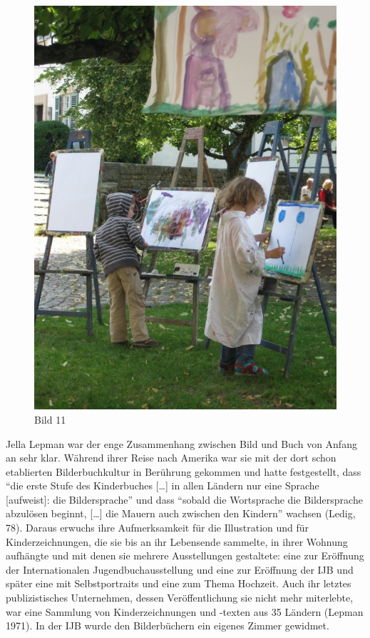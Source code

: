 \documentclass[a4paper,
fontsize=11pt,
oneside,
numbers=noperiodatend,
parskip=half-,
bibliography=totoc,
final
]{scrartcl}
\begin{document}
\begin{figure}[htbp]
\centering
\includegraphics{img/Bild11.jpg}
\caption{Bild 11}
\end{figure}

Jella Lepman war der enge Zusammenhang zwischen Bild und Buch von Anfang
an sehr klar. Während ihrer Reise nach Amerika war sie mit der dort
schon etablierten Bilderbuchkultur in Berührung gekommen und hatte
festgestellt, dass \enquote{die erste Stufe des Kinderbuches
{[}\ldots{}{]} in allen Ländern nur eine Sprache {[}aufweist{]}: die
Bildersprache} und dass \enquote{sobald die Wortsprache die
Bildersprache abzulösen beginnt, {[}\ldots{}{]} die Mauern auch zwischen
den Kindern} wachsen (Ledig, 78). Daraus erwuchs ihre Aufmerksamkeit für
die Illustration und für Kinderzeichnungen, die sie bis an ihr
Lebensende sammelte, in ihrer Wohnung aufhängte und mit denen sie
mehrere Ausstellungen gestaltete: eine zur Eröffnung der Internationalen
Jugendbuchausstellung und eine zur Eröffnung der IJB und später eine mit
Selbstportraits und eine zum Thema Hochzeit. Auch ihr letztes
publizistisches Unternehmen, dessen Veröffentlichung sie nicht mehr
miterlebte, war eine Sammlung von Kinderzeichnungen und -texten aus 35
Ländern (Lepman 1971). In der IJB wurde den Bilderbüchern ein eigenes
Zimmer gewidmet.~
\end{document}
